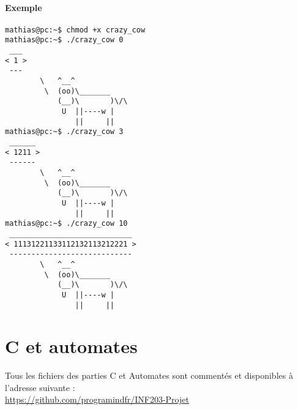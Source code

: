 \documentclass[french, 10pt, a4paper]{article}
\begin{document}
\paragraph{Exemple}
\begin{verbatim}
mathias@pc:~$ chmod +x crazy_cow
mathias@pc:~$ ./crazy_cow 0
 ___
< 1 >
 ---
		\   ^__^
		 \  (oo)\_______
			(__)\       )\/\
			 U  ||----w |
				||     ||
mathias@pc:~$ ./crazy_cow 3
 ______
< 1211 >
 ------
		\   ^__^
		 \  (oo)\_______
			(__)\       )\/\
			 U  ||----w |
				||     ||
mathias@pc:~$ ./crazy_cow 10
 ____________________________
< 11131221133112132113212221 >
 ----------------------------
		\   ^__^
		 \  (oo)\_______
			(__)\       )\/\
			 U  ||----w |
				||     ||
\end{verbatim}



\section{C et automates}

Tous les fichiers des parties C et Automates sont commentés et disponibles à l'adresse suivante :\\ \href{https://github.com/programindfr/INF203-Projet}{https://github.com/programindfr/INF203-Projet}
\end{document}
